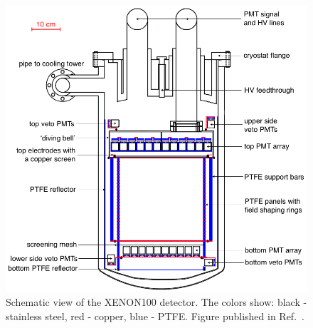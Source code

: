 \begin{figure}[!t]
\centering
\includegraphics[width=1.0\linewidth]{plots/Detector/Xe100_CAD_withLabelsAndScale.png}
\caption[Schematic view of the XENON100 detector]{Schematic view of the XENON100 detector. The colors show: black - stainless steel, red - copper, blue - PTFE. Figure published in Ref.~\cite{xe100-instrument}.}
\label{figXe100CAD}
\end{figure}


